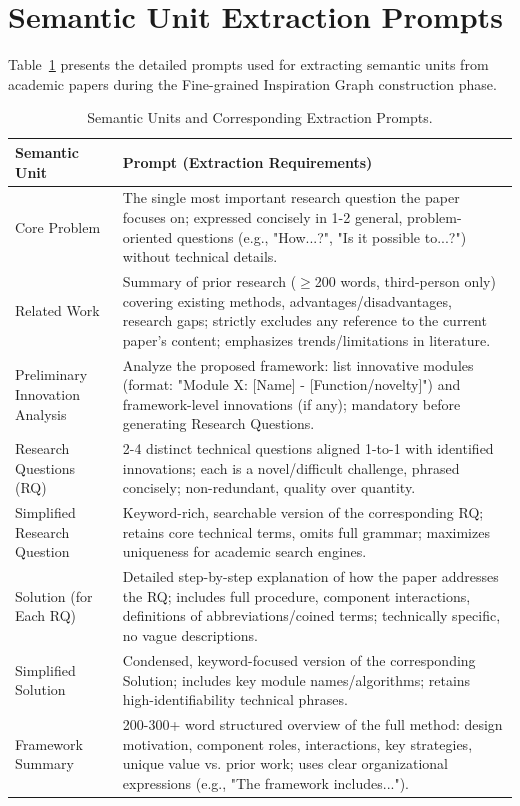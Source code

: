 
\section{Semantic Unit Extraction Prompts}
\label{app:semantic_prompts}

Table~\ref{tab:semantic_prompt_extraction} presents the detailed prompts used for extracting semantic units from academic papers during the Fine-grained Inspiration Graph construction phase.

\begin{table}[h]
\centering
\setlength\tabcolsep{6pt}
\renewcommand{\arraystretch}{1.4}
\small
\begin{tabular}{p{3.5cm}p{9.5cm}}
\toprule
\textbf{Semantic Unit} & \textbf{Prompt (Extraction Requirements)} \\
\midrule
Core Problem & The single most important research question the paper focuses on; expressed concisely in 1-2 general, problem-oriented questions (e.g., "How...?", "Is it possible to...?") without technical details. \\
\midrule
Related Work & Summary of prior research ($\geq$200 words, third-person only) covering existing methods, advantages/disadvantages, research gaps; strictly excludes any reference to the current paper's content; emphasizes trends/limitations in literature. \\
\midrule
Preliminary Innovation Analysis & Analyze the proposed framework: list innovative modules (format: "Module X: [Name] - [Function/novelty]") and framework-level innovations (if any); mandatory before generating Research Questions. \\
\midrule
Research Questions (RQ) & 2-4 distinct technical questions aligned 1-to-1 with identified innovations; each is a novel/difficult challenge, phrased concisely; non-redundant, quality over quantity. \\
\midrule
Simplified Research Question & Keyword-rich, searchable version of the corresponding RQ; retains core technical terms, omits full grammar; maximizes uniqueness for academic search engines. \\
\midrule
Solution (for Each RQ) & Detailed step-by-step explanation of how the paper addresses the RQ; includes full procedure, component interactions, definitions of abbreviations/coined terms; technically specific, no vague descriptions. \\
\midrule
Simplified Solution & Condensed, keyword-focused version of the corresponding Solution; includes key module names/algorithms; retains high-identifiability technical phrases. \\
\midrule
Framework Summary & 200-300+ word structured overview of the full method: design motivation, component roles, interactions, key strategies, unique value vs. prior work; uses clear organizational expressions (e.g., "The framework includes..."). \\
\bottomrule
\end{tabular}
\caption{Semantic Units and Corresponding Extraction Prompts.}
\label{tab:semantic_prompt_extraction}
\end{table}


